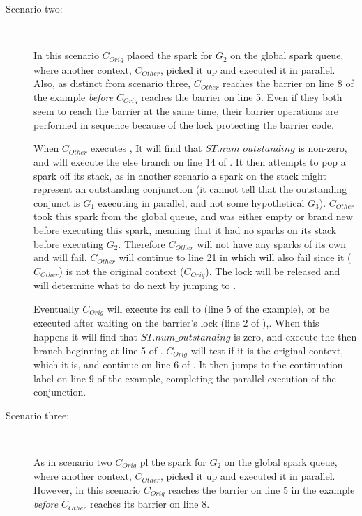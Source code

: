 \begin{description}
    \item[Scenario two:]~

    In this scenario $C_{Orig}$ placed the spark for $G_2$ on the 
    global spark queue,
    where another context, $C_{Other}$, picked it up and executed it
    in parallel.
    Also, as distinct from scenario three,
    $C_{Other}$ reaches the barrier on line 8 of the example \emph{before}
    $C_{Orig}$ reaches the barrier on line 5.
    Even if they both seem to reach the barrier at the same time,
    their barrier operations are performed in sequence because of the
    lock protecting the barrier code.

    When $C_{Other}$ executes \joinandcontinue,
    It will find that $ST.num\_outstanding$ is non-zero,
    and will execute the else branch on line 14 of \joinandcontinue.
    It then attempts to pop a spark off its stack,
    as in another scenario a spark on the stack might represent an
    outstanding conjunction
    (it cannot tell that the outstanding conjunct is $G_1$ executing in
    parallel, and not some hypothetical $G_3$).
    $C_{Other}$ took this spark from the global queue,
    and was either empty or brand new before executing this spark,
    meaning that it had no sparks on its stack before executing $G_2$.
    Therefore $C_{Other}$ will not have any sparks of its own and
     will fail.
    $C_{Other}$ will continue to line 21 in \joinandcontinue
    which will also fail since it ($C_{Other}$)
    is not the original context ($C_{Orig}$).
    The lock will be released and \joinandcontinue will determine what to do
    next by jumping to \idle.

    Eventually $C_{Orig}$ will execute its call to \joinandcontinue
    (line 5 of the example),
    or be executed after waiting on the barrier's lock (line 2 of
    \joinandcontinue),.
    When this happens it will find that $ST.num\_outstanding$ is zero,
    and execute the then branch beginning at line 5 of \joinandcontinue.
    $C_{Orig}$ will test if it is the original context, 
    which it is,
    and continue on line 6 of \joinandcontinue.
    It then jumps to the continuation label on line 9 of the example,
    completing the parallel execution of the conjunction.

    \item[Scenario three:]~

    As in scenario two $C_{Orig}$ pl the spark for $G_2$ on the global spark
    queue,
    where another context, $C_{Other}$, picked it up and executed it
    in parallel.
    However,
    in this scenario
    $C_{Orig}$ reaches the barrier on line 5 in the example \emph{before}
    $C_{Other}$ reaches its barrier on line 8.


\end{description}
